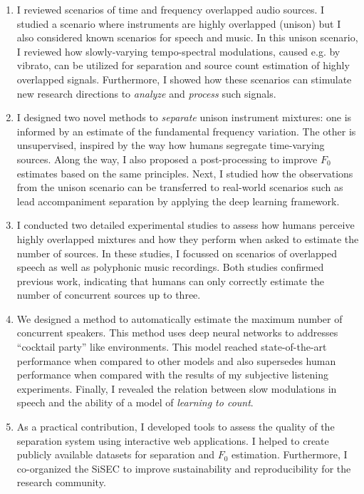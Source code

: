\begin{enumerate}
\item I reviewed scenarios of time and frequency overlapped audio sources.
I studied a scenario where instruments are highly overlapped (unison) but I also considered known scenarios for speech and music.
In this unison scenario, I reviewed how slowly-varying tempo-spectral modulations, caused e.g. by vibrato, can be utilized for separation and source count estimation of highly overlapped signals.
Furthermore, I showed how these scenarios can stimulate new research directions to \emph{analyze} and \emph{process} such signals.

\item I designed two novel methods to \emph{separate} unison instrument mixtures: one is informed by an estimate of the fundamental frequency variation.
The other is unsupervised, inspired by the way how humans segregate time-varying sources.
Along the way, I also proposed a post-processing to improve \(F_0\) estimates based on the same principles.
Next, I studied how the observations from the unison scenario can be transferred to real-world scenarios such as lead accompaniment separation by applying the deep learning framework.

\item I conducted two detailed experimental studies to assess how humans perceive highly overlapped mixtures and how they perform when asked to estimate the number of sources.
In these studies, I focussed on scenarios of overlapped speech as well as polyphonic music recordings.
Both studies confirmed previous work, indicating that humans can only correctly estimate the number of concurrent sources up to three.

\item We designed a method to automatically estimate the maximum number of concurrent speakers. This method uses deep neural networks to addresses ``cocktail party'' like environments.
This model reached state-of-the-art performance when compared to other models and also supersedes human performance when compared with the results of my subjective listening experiments.
Finally, I revealed the relation between slow modulations in speech and the ability of a model of \emph{learning to count}.

\item As a practical contribution, I developed tools to assess the quality of the separation system using interactive web applications. 
I helped to create publicly available datasets for separation and \(F_0\) estimation.
Furthermore, I co-organized the \ac{SiSEC} to improve sustainability and reproducibility for the research community.
\end{enumerate}

